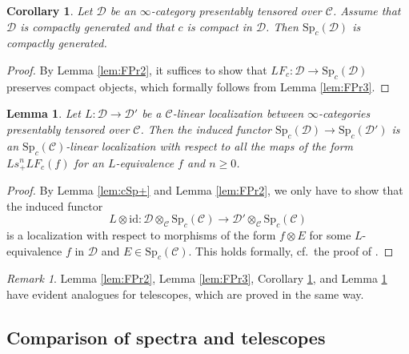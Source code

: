 \documentclass{amsart}
\theoremstyle{plain}
\newtheorem{lemma}[theorem]{Lemma}
\newtheorem{corollary}[theorem]{Corollary}
\theoremstyle{definition}
\theoremstyle{remark}
\newtheorem{remark}[theorem]{Remark}
\numberwithin{equation}{theorem}
\newcommand{\mcal}[1]{\mathcal{#1}}
\newcommand{\Sp}{\mathrm{Sp}}
\newcommand{\id}{\mathrm{id}}
\begin{document}
\begin{corollary}\label{cor:FPr}
Let $\mcal{D}$ be an $\infty$-category presentably tensored over $\mcal{C}$.
Assume that $\mcal{D}$ is compactly generated and that $c$ is compact in $\mcal{D}$.
Then $\Sp_c(\mcal{D})$ is compactly generated.
\end{corollary}
\begin{proof}
By Lemma \ref{lem:FPr2}, it suffices to show that $LF_c\colon\mcal{D}\to\Sp_c(\mcal{D})$ preserves compact objects, which formally follows from Lemma \ref{lem:FPr3}.
\end{proof}

\begin{lemma}\label{lem:FPr4}
Let $L\colon\mcal{D}\to\mcal{D}'$ be a $\mcal{C}$-linear localization between $\infty$-categories presentably tensored over $\mcal{C}$.
Then the induced functor $\Sp_c(\mcal{D})\to\Sp_c(\mcal{D}')$ is an $\Sp_c(\mcal{C})$-linear localization with respect to all the maps of the form $Ls_+^nLF_c(f)$ for an $L$-equivalence $f$ and $n\ge 0$.
\end{lemma}
\begin{proof}
By Lemma \ref{lem:cSp+} and Lemma \ref{lem:FPr2}, we only have to show that the induced functor
\[
	L\otimes\id \colon \mcal{D}\otimes_\mcal{C}\Sp_c(\mcal{C}) \to \mcal{D}'\otimes_\mcal{C}\Sp_c(\mcal{C}) 
\]
is a localization with respect to morphisms of the form $f\otimes E$ for some $L$-equivalence $f$ in $\mcal{D}$ and $E\in\Sp_c(\mcal{C})$.
This holds formally, cf.\ the proof of \cite[4.8.1.15]{HA}.
\end{proof}

\begin{remark}
Lemma \ref{lem:FPr2}, Lemma \ref{lem:FPr3}, Corollary \ref{cor:FPr}, and Lemma \ref{lem:FPr4} have evident analogues for telescopes, which are proved in the same way.
\end{remark}


\subsection{Comparison of spectra and telescopes}\label{CST}
\end{document}
